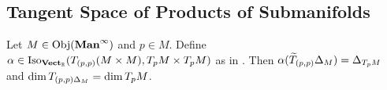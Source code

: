 \documentclass{book}
\begin{document}
\subsection{Tangent Space of Products of Submanifolds}

\begin{ex} 
	Let $M \in \operatorname{Obj}(\operatorname*{\text{\textbf{Man}}^{\infty}})$ and $p \in M$. Define $\alpha \in \operatorname{Iso}_{\operatorname*{\text{\textbf{Vect}}_{\mathbb{R}}}}(T_{(p,p)}(M \times M), T_pM \times  T_pM)$ as in . Then $\alpha (\widetilde{T}_{(p,p)} \Delta_M) = \Delta_{T_p M}$ and $\dim T_{(p,p) \Delta_M} = \dim T_p M$.
\end{ex}
\end{document}
